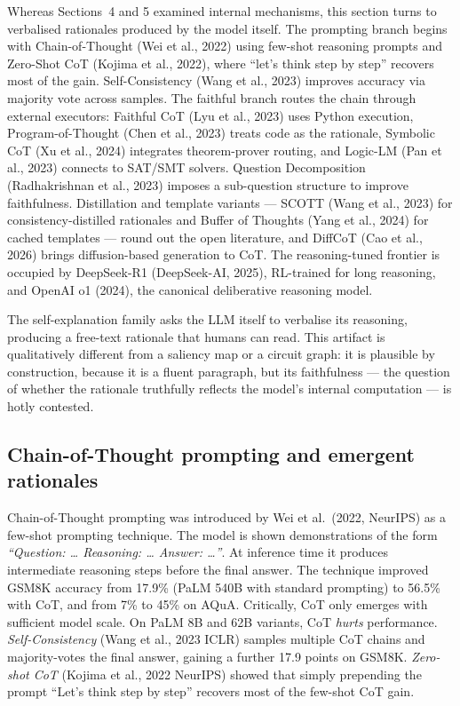 Whereas Sections~4 and 5 examined internal mechanisms, this section turns to verbalised rationales produced by the model itself. The prompting branch begins with Chain-of-Thought (Wei et al., 2022) using few-shot reasoning prompts and Zero-Shot CoT (Kojima et al., 2022), where ``let's think step by step'' recovers most of the gain. Self-Consistency (Wang et al., 2023) improves accuracy via majority vote across samples. The faithful branch routes the chain through external executors: Faithful CoT (Lyu et al., 2023) uses Python execution, Program-of-Thought (Chen et al., 2023) treats code as the rationale, Symbolic CoT (Xu et al., 2024) integrates theorem-prover routing, and Logic-LM (Pan et al., 2023) connects to SAT/SMT solvers. Question Decomposition (Radhakrishnan et al., 2023) imposes a sub-question structure to improve faithfulness. Distillation and template variants --- SCOTT (Wang et al., 2023) for consistency-distilled rationales and Buffer of Thoughts (Yang et al., 2024) for cached templates --- round out the open literature, and DiffCoT (Cao et al., 2026) brings diffusion-based generation to CoT. The reasoning-tuned frontier is occupied by DeepSeek-R1 (DeepSeek-AI, 2025), RL-trained for long reasoning, and OpenAI o1 (2024), the canonical deliberative reasoning model.

The self-explanation family asks the LLM itself to verbalise its reasoning, producing a free-text rationale that humans can read. This artifact is qualitatively different from a saliency map or a circuit graph: it is plausible by construction, because it is a fluent paragraph, but its faithfulness --- the question of whether the rationale truthfully reflects the model's internal computation --- is hotly contested.

\subsection{Chain-of-Thought prompting and emergent rationales}\label{chain-of-thought-prompting-and-emergent-rationales}

Chain-of-Thought prompting was introduced by Wei et al.~(2022, NeurIPS) as a few-shot prompting technique. The model is shown demonstrations of the form \emph{``Question: \ldots{} Reasoning: \ldots{} Answer: \ldots{}''}. At inference time it produces intermediate reasoning steps before the final answer. The technique improved GSM8K accuracy from 17.9\% (PaLM 540B with standard prompting) to 56.5\% with CoT, and from 7\% to 45\% on AQuA. Critically, CoT only emerges with sufficient model scale. On PaLM 8B and 62B variants, CoT \emph{hurts} performance. \emph{Self-Consistency} (Wang et al., 2023 ICLR) samples multiple CoT chains and majority-votes the final answer, gaining a further 17.9 points on GSM8K. \emph{Zero-shot CoT} (Kojima et al., 2022 NeurIPS) showed that simply prepending the prompt ``Let's think step by step'' recovers most of the few-shot CoT gain.

